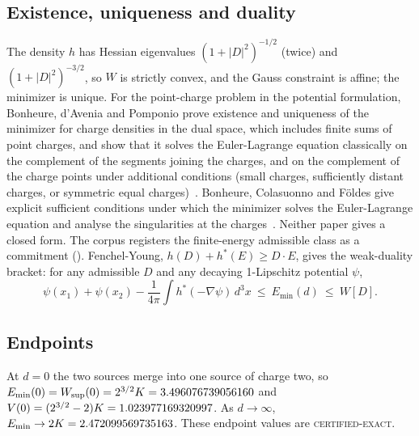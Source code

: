 \documentclass[aps,prd,onecolumn,amsmath,amssymb,longbibliography,floatfix,nofootinbib]{revtex4-2}
\newcommand{\Wsup}{W_{\mathrm{sup}}}
\newcommand{\Emin}{E_{\min}}
\newcommand{\st}[1]{\textsc{#1}}
\begin{document}
\subsection{Existence, uniqueness and duality}
The density $h$ has Hessian eigenvalues $(1+|D|^2)^{-1/2}$ (twice) and $(1+|D|^2)^{-3/2}$, so $W$ is strictly convex, and the Gauss constraint is affine; the minimizer is unique. For the point-charge problem in the potential formulation, Bonheure, d'Avenia and Pomponio prove existence and uniqueness of the minimizer for charge densities in the dual space, which includes finite sums of point charges, and show that it solves the Euler-Lagrange equation classically on the complement of the segments joining the charges, and on the complement of the charge points under additional conditions (small charges, sufficiently distant charges, or symmetric equal charges)~\cite{BdAP2016}. Bonheure, Colasuonno and F\"oldes give explicit sufficient conditions under which the minimizer solves the Euler-Lagrange equation and analyse the singularities at the charges~\cite{BCF2019}. Neither paper gives a closed form. The corpus registers the finite-energy admissible class as a commitment (). Fenchel-Young, $h(D)+h^*(E)\ge D\cdot E$, gives the weak-duality bracket: for any admissible $D$ and any decaying 1-Lipschitz potential $\psi$,
\begin{equation}
\psi(x_1)+\psi(x_2)-\frac{1}{4\pi}\int h^*(-\nabla\psi)\,d^3x\ \le\ \Emin(d)\ \le\ W[D].
\label{eq:bracket}
\end{equation}

\subsection{Endpoints}
At $d=0$ the two sources merge into one source of charge two, so $\Emin(0)=\Wsup(0)=2^{3/2}K=\ContactTotalVal$ and $V(0)=(2^{3/2}-2)K=1.023977169320997$. As $d\to\infty$, $\Emin\to 2K=\TwoKVal$. These endpoint values are \st{certified-exact}.
\end{document}
